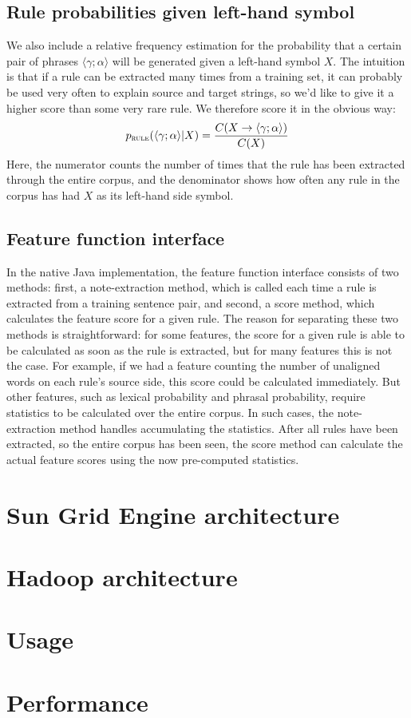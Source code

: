 \documentclass{pbml}
\begin{document}
\subsection{Rule probabilities given left-hand symbol}
We also include a relative frequency estimation for the probability that a certain pair of phrases $\langle \gamma ; \alpha \rangle$ will be generated given a left-hand symbol $X$. The intuition is that if a rule can be extracted many times from a training set, it can probably be used very often to explain source and target strings, so we'd like to give it a higher score than some very rare rule. We therefore score it in the obvious way:
$$p_{\textsc{rule}}(\langle \gamma ; \alpha \rangle | X) = \frac{C(X \to \langle \gamma ; \alpha \rangle)}{C(X)}$$
Here, the numerator counts the number of times that the rule has been extracted through the entire corpus, and the denominator shows how often any rule in the corpus has had $X$ as its left-hand side symbol.

\subsection{Feature function interface}

In the native Java implementation, the feature function interface consists of two methods: first, a {\sc note-extraction} method, which is called each time a rule is extracted from a training sentence pair, and second, a {\sc score} method, which calculates the feature score for a given rule. The reason for separating these two methods is straightforward: for some features, the score for a given rule is able to be calculated as soon as the rule is extracted, but for many features this is not the case. For example, if we had a feature counting the number of unaligned words on each rule's source side, this score could be calculated immediately. But other features, such as lexical probability and phrasal probability, require statistics to be calculated over the entire corpus. In such cases, the {\sc note-extraction} method handles accumulating the statistics. After all rules have been extracted, so the entire corpus has been seen, the {\sc score} method can calculate the actual feature scores using the now pre-computed statistics.

\section{Sun Grid Engine architecture}
\label{sec:sge}

\section{Hadoop architecture}
\label{sec:hadoop}

\section{Usage}
\label{sec:usage}

\section{Performance}
\label{sec:performance}


\end{document}
